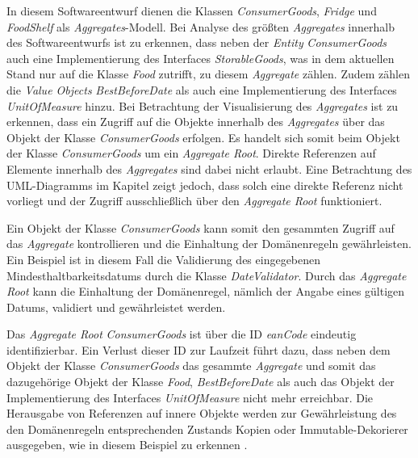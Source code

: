 \label{domaindrivendesign>aggregates}
In diesem Softwareentwurf dienen die Klassen \textit{ConsumerGoods}, \textit{Fridge} und \textit{FoodShelf} als \textit{Aggregates}-Modell.
Bei Analyse des größten \textit{Aggregates} innerhalb des Softwareentwurfs ist zu erkennen, dass neben der \textit{Entity} \textit{ConsumerGoods} auch eine Implementierung des Interfaces \textit{StorableGoods}, was in dem aktuellen Stand nur auf die Klasse \textit{Food} zutrifft, zu diesem \textit{Aggregate} zählen. Zudem zählen die \textit{Value Objects} \textit{BestBeforeDate} als auch eine Implementierung des Interfaces \textit{UnitOfMeasure} hinzu.
Bei Betrachtung der Visualisierung des \textit{Aggregates} ist zu erkennen, dass ein Zugriff auf die Objekte innerhalb des \textit{Aggregates} über das Objekt der Klasse \textit{ConsumerGoods} erfolgen.
Es handelt sich somit beim Objekt der Klasse \textit{ConsumerGoods} um ein \textit{Aggregate Root}.
Direkte Referenzen auf Elemente innerhalb des \textit{Aggregates} sind dabei nicht erlaubt.
Eine Betrachtung des UML-Diagramms im Kapitel  zeigt jedoch, dass solch eine direkte Referenz nicht vorliegt und der Zugriff ausschließlich über den \textit{Aggregate Root} funktioniert.

Ein Objekt der Klasse \textit{ConsumerGoods} kann somit den gesammten Zugriff auf das \textit{Aggregate} kontrollieren und die Einhaltung der Domänenregeln gewährleisten.
Ein Beispiel ist in diesem Fall die Validierung des eingegebenen Mindesthaltbarkeitsdatums durch die Klasse \textit{DateValidator}.
Durch das \textit{Aggregate Root} kann die Einhaltung der Domänenregel, nämlich der Angabe eines gültigen Datums, validiert und gewährleistet werden.

Das \textit{Aggregate Root} \textit{ConsumerGoods} ist über die ID \textit{eanCode} eindeutig identifizierbar.
Ein Verlust dieser ID zur Laufzeit führt dazu, dass neben dem Objekt der Klasse \textit{ConsumerGoods} das gesammte \textit{Aggregate} und somit das dazugehörige Objekt der Klasse \textit{Food}, \textit{BestBeforeDate} als auch das Objekt der Implementierung des Interfaces \textit{UnitOfMeasure} nicht mehr erreichbar.
Die Herausgabe von Referenzen auf innere Objekte werden zur Gewährleistung des den Domänenregeln entsprechenden Zustands Kopien oder Immutable-Dekorierer ausgegeben, wie in diesem Beispiel zu erkennen .

